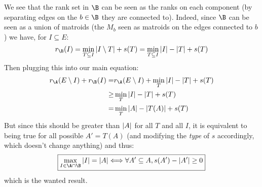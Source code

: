 \documentclass[math, info]{cours}
\begin{document}
We see that the rank set in $\B$ can be seen as the ranks on each component (by separating edges on the $b \in \B$ they are connected to).
Indeed, since $\B$ can be seen as a union of matroids (the $M_{b}$ seen as matroids on the edges connected to $b$) we have, for $I \subseteq E$:
\begin{equation*}
	r_{\B}(I) = \min_{T \subseteq I} \abs{I\setminus T} + s(T) = \min_{T \subseteq I} \abs{I} - \abs{T} + s(T)
\end{equation*}
Then plugging this into our main equation:
\begin{equation*}
	\begin{aligned}
		r_{\A}(E\setminus I)  + r_{\B}(I) =& r_{\A}(E\setminus I) + \min_{T} \abs{I} - \abs{T} + s(T)\\
		\geq & \min_{T} \abs{I} - \abs{T} + s(T)\\
		= & \min_{T} \abs{A} - \abs{T(A)} + s(T)
	\end{aligned}
\end{equation*}
But since this should be greater than $\left|A\right|$ for all $T$ and all $I$, it is equivalent to being true for all possible $A' = T(A)$ (and modifying the \emph{type} of $s$ accordingly, which doesn't change anything) and thus:
\begin{equation*}
	\boxed{\max_{I\in \A \cap \B} \abs{I} = \abs{A} \Longleftrightarrow \forall A'\subseteq A, s(A') - \abs{A'} \geq 0}
\end{equation*}
which is the wanted result.
\end{document}
